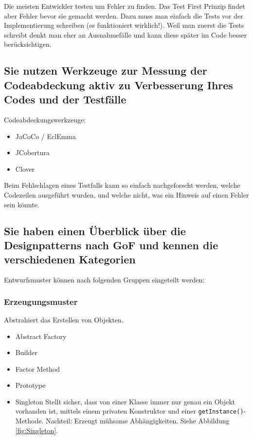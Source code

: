 Die meisten Entwickler testen um Fehler zu finden. Das Test First Prinzip findet aber Fehler bevor sie gemacht werden. 
Dazu muss man einfach die Tests vor der Implementierung schreiben (es funktioniert wirklich!). 
Weil man zuerst die Tests schreibt denkt man eher an Ausnahmefälle und kann diese später im Code besser berücksichtigen.

\subsection{Sie nutzen Werkzeuge zur Messung der Codeabdeckung aktiv zu Verbesserung Ihres Codes und der Testfälle}

Codeabdeckungswerkzeuge:
\begin{itemize}
	\item JaCoCo / EclEmma
	\item JCobertura
	\item Clover
\end{itemize}
Beim Fehlschlagen eines Testfalls kann so einfach nachgeforscht werden, welche Codezeilen ausgeführt wurden, und welche nicht, was ein Hinweis auf einen Fehler sein könnte.

\subsection{Sie haben einen Überblick über die Designpatterns nach GoF und kennen die verschiedenen Kategorien}
Entwurfsmuster können nach folgenden Gruppen eingeteilt werden:
\subsubsection{Erzeugungsmuster}
Abstrahiert das Erstellen von Objekten.
\begin{itemize}
    \item Abstract Factory
    \item Builder
    \item Factor Method
    \item Prototype
    \item Singleton
    \subitem Stellt sicher, dass von einer Klasse immer nur genau ein Objekt vorhanden ist, mittels einem privaten Konstruktor und einer \verb|getInstance()|-Methode. Nachteil: Erzeugt mühsame Abhängigkeiten. 
    Siehe Abbildung \ref{fig:Singleton}.
    
\end{itemize}

